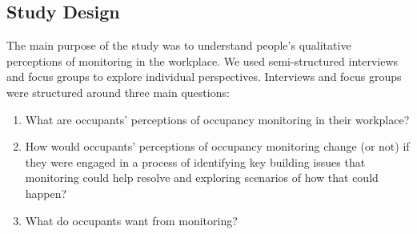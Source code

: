\subsection{Study Design}
\label{sec:study-design}

The main purpose of the study was to understand people’s qualitative
perceptions of monitoring in the workplace. We used semi-structured
interviews and focus groups to explore individual perspectives. 
Interviews and focus groups were structured around three main
questions:

\begin{enumerate}
\item What are occupants’ perceptions of occupancy monitoring in their workplace?
\item How would occupants’ perceptions of occupancy monitoring change
  (or not) if they were engaged in a process of identifying key
  building issues that monitoring could help resolve and exploring
  scenarios of how that could happen? 
\item What do occupants want from monitoring?
\end{enumerate}

